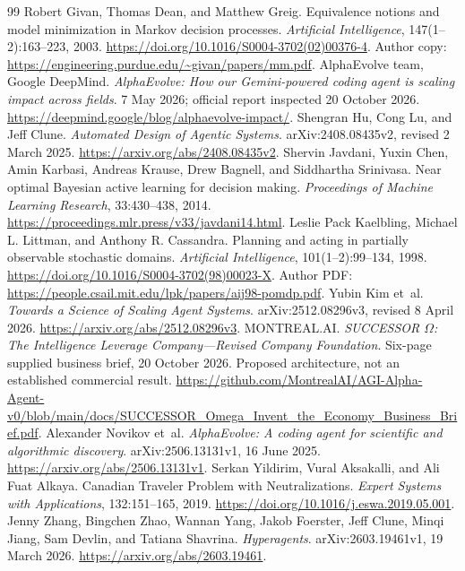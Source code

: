 \documentclass[11pt,letterpaper]{article}
\theoremstyle{remark}\newtheorem{remark}{Remark}[section]
\begin{document}
\begin{thebibliography}{99}
Robert Givan, Thomas Dean, and Matthew Greig. Equivalence notions and model minimization in Markov decision processes. \emph{Artificial Intelligence}, 147(1--2):163--223, 2003. \url{https://doi.org/10.1016/S0004-3702(02)00376-4}. Author copy: \url{https://engineering.purdue.edu/~givan/papers/mm.pdf}.
AlphaEvolve team, Google DeepMind. \emph{AlphaEvolve: How our Gemini-powered coding agent is scaling impact across fields}. 7 May 2026; official report inspected 20 October 2026. \url{https://deepmind.google/blog/alphaevolve-impact/}.
Shengran Hu, Cong Lu, and Jeff Clune. \emph{Automated Design of Agentic Systems}. arXiv:2408.08435v2, revised 2 March 2025. \url{https://arxiv.org/abs/2408.08435v2}.
Shervin Javdani, Yuxin Chen, Amin Karbasi, Andreas Krause, Drew Bagnell, and Siddhartha Srinivasa. Near optimal Bayesian active learning for decision making. \emph{Proceedings of Machine Learning Research}, 33:430--438, 2014. \url{https://proceedings.mlr.press/v33/javdani14.html}.
Leslie Pack Kaelbling, Michael L. Littman, and Anthony R. Cassandra. Planning and acting in partially observable stochastic domains. \emph{Artificial Intelligence}, 101(1--2):99--134, 1998. \url{https://doi.org/10.1016/S0004-3702(98)00023-X}. Author PDF: \url{https://people.csail.mit.edu/lpk/papers/aij98-pomdp.pdf}.
Yubin Kim et~al. \emph{Towards a Science of Scaling Agent Systems}. arXiv:2512.08296v3, revised 8 April 2026. \url{https://arxiv.org/abs/2512.08296v3}.
MONTREAL.AI. \emph{SUCCESSOR $\Omega$: The Intelligence Leverage Company---Revised Company Foundation}. Six-page supplied business brief, 20 October 2026. Proposed architecture, not an established commercial result. \url{https://github.com/MontrealAI/AGI-Alpha-Agent-v0/blob/main/docs/SUCCESSOR_Omega_Invent_the_Economy_Business_Brief.pdf}.
Alexander Novikov et~al. \emph{AlphaEvolve: A coding agent for scientific and algorithmic discovery}. arXiv:2506.13131v1, 16 June 2025. \url{https://arxiv.org/abs/2506.13131v1}.
Serkan Yildirim, Vural Aksakalli, and Ali Fuat Alkaya. Canadian Traveler Problem with Neutralizations. \emph{Expert Systems with Applications}, 132:151--165, 2019. \url{https://doi.org/10.1016/j.eswa.2019.05.001}.
Jenny Zhang, Bingchen Zhao, Wannan Yang, Jakob Foerster, Jeff Clune, Minqi Jiang, Sam Devlin, and Tatiana Shavrina. \emph{Hyperagents}. arXiv:2603.19461v1, 19 March 2026. \url{https://arxiv.org/abs/2603.19461}.
\end{thebibliography}
\end{document}
